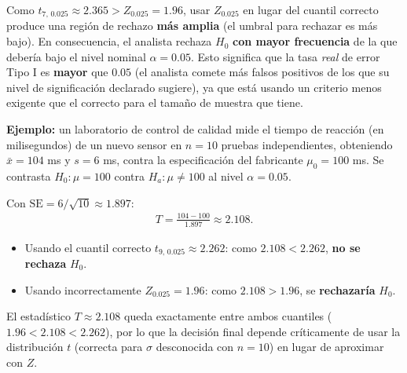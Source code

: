 \begin{solproblema}
	Como $t_{7,\,0.025} \approx 2.365 > Z_{0.025} = 1.96$, usar $Z_{0.025}$ en lugar del cuantil correcto produce una región de rechazo \textbf{más amplia} (el umbral para rechazar es más bajo). En consecuencia, el analista rechaza $H_0$ \textbf{con mayor frecuencia} de la que debería bajo el nivel nominal $\alpha = 0.05$. Esto significa que la tasa \emph{real} de error Tipo I es \textbf{mayor} que $0.05$ (el analista comete más falsos positivos de los que su nivel de significación declarado sugiere), ya que está usando un criterio menos exigente que el correcto para el tamaño de muestra que tiene.
\end{solproblema}

\begin{solproblema}[prob:cb4980c]
	\textbf{Ejemplo:} un laboratorio de control de calidad mide el tiempo de reacción (en milisegundos) de un nuevo sensor en $n = 10$ pruebas independientes, obteniendo $\bar{x} = 104$ ms y $s = 6$ ms, contra la especificación del fabricante $\mu_0 = 100$ ms. Se contrasta $H_0: \mu = 100$ contra $H_a: \mu \neq 100$ al nivel $\alpha = 0.05$.

	Con $\text{SE} = 6/\sqrt{10} \approx 1.897$:
	\begin{align}
		T = \frac{104 - 100}{1.897} \approx 2.108.
	\end{align}
	\begin{itemize}
		\item Usando el cuantil correcto $t_{9,\,0.025} \approx 2.262$: como $2.108 < 2.262$, \textbf{no se rechaza} $H_0$.
		\item Usando incorrectamente $Z_{0.025} = 1.96$: como $2.108 > 1.96$, se \textbf{rechazaría} $H_0$.
	\end{itemize}
	El estadístico $T \approx 2.108$ queda exactamente entre ambos cuantiles ($1.96 < 2.108 < 2.262$), por lo que la decisión final depende críticamente de usar la distribución $t$ (correcta para $\sigma$ desconocida con $n = 10$) en lugar de aproximar con $Z$.
\end{solproblema}
